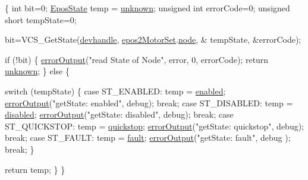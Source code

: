 \begin{DoxyCode}
\{
    \textcolor{keywordtype}{int} bit=0;
    \hyperlink{classEpos2MotorController_ab5ec630dfbb90ad674e311187926060c}{EposState} temp = \hyperlink{classEpos2MotorController_ab5ec630dfbb90ad674e311187926060cad38c41836bbe157863e3eae0d308b7ca}{unknown};
    \textcolor{keywordtype}{unsigned} \textcolor{keywordtype}{int} errorCode=0;
    \textcolor{keywordtype}{unsigned} \textcolor{keywordtype}{short} tempState=0;

    bit=VCS\_GetState(\hyperlink{classEpos2MotorController_a40594faab444bcba221ab9d55d1162cd}{devhandle}, \hyperlink{classEpos2MotorController_a0856f5fdd71ffa3b84a536afa085bfb1}{epos2MotorSet}.\hyperlink{structEpos2MotorController_1_1epos2Settings_ab8f18d3df17e8de9ed5250a3e53292c6}{node}, &
      tempState, &errorCode);

    \textcolor{keywordflow}{if} (!bit) \{
        \hyperlink{classEpos2MotorController_a64d5e3e3858597c111e60ba8b382a63b}{errorOutput}(\textcolor{stringliteral}{"read State of Node"}, error, 0, errorCode);
        \textcolor{keywordflow}{return} \hyperlink{classEpos2MotorController_ab5ec630dfbb90ad674e311187926060cad38c41836bbe157863e3eae0d308b7ca}{unknown};
    \} \textcolor{keywordflow}{else} \{

        \textcolor{keywordflow}{switch} (tempState) \{
            \textcolor{keywordflow}{case} ST\_ENABLED:    temp = \hyperlink{classEpos2MotorController_ab5ec630dfbb90ad674e311187926060cae6493e2426163b114bea951ab9a419d5}{enabled};
                                \hyperlink{classEpos2MotorController_a64d5e3e3858597c111e60ba8b382a63b}{errorOutput}(\textcolor{stringliteral}{"getState: enabled"}, 
      debug);
                                \textcolor{keywordflow}{break};
            \textcolor{keywordflow}{case} ST\_DISABLED:   temp = \hyperlink{classEpos2MotorController_ab5ec630dfbb90ad674e311187926060caf0eea74682d3d3f21bec6e5b376cf443}{disabled};
                                \hyperlink{classEpos2MotorController_a64d5e3e3858597c111e60ba8b382a63b}{errorOutput}(\textcolor{stringliteral}{"getState: disabled"}, 
      debug);
                                \textcolor{keywordflow}{break};
            \textcolor{keywordflow}{case} ST\_QUICKSTOP:  temp = \hyperlink{classEpos2MotorController_ab5ec630dfbb90ad674e311187926060caa83d02e81212676710b3c6d97cb30119}{quickstop};
                                \hyperlink{classEpos2MotorController_a64d5e3e3858597c111e60ba8b382a63b}{errorOutput}(\textcolor{stringliteral}{"getState: quickstop"}, 
      debug);
                                \textcolor{keywordflow}{break};
            \textcolor{keywordflow}{case} ST\_FAULT:      temp = \hyperlink{classEpos2MotorController_ab5ec630dfbb90ad674e311187926060ca9c2b33ebbe5a72ad6d09d6af6531237c}{fault};
                                \hyperlink{classEpos2MotorController_a64d5e3e3858597c111e60ba8b382a63b}{errorOutput}(\textcolor{stringliteral}{"getState: fault"}, debug
      );
                                \textcolor{keywordflow}{break};
        \}

        \textcolor{keywordflow}{return} temp;
    \}
\}
\end{DoxyCode}
